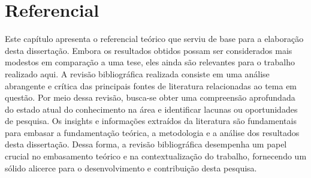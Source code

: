 \section{Referencial}\label{sec:refteo}


Este capítulo apresenta o referencial teórico que serviu de base para a elaboração desta dissertação. Embora os resultados obtidos possam ser considerados mais modestos em comparação a uma tese, eles ainda são relevantes para o trabalho realizado aqui. A revisão bibliográfica realizada consiste em uma análise abrangente e crítica das principais fontes de literatura relacionadas ao tema em questão. Por meio dessa revisão, busca-se obter uma compreensão aprofundada do estado atual do conhecimento na área e identificar lacunas ou oportunidades de pesquisa. Os insights e informações extraídos da literatura são fundamentais para embasar a fundamentação teórica, a metodologia e a análise dos resultados desta dissertação. Dessa forma, a revisão bibliográfica desempenha um papel crucial no embasamento teórico e na contextualização do trabalho, fornecendo um sólido alicerce para o desenvolvimento e contribuição desta pesquisa.




















